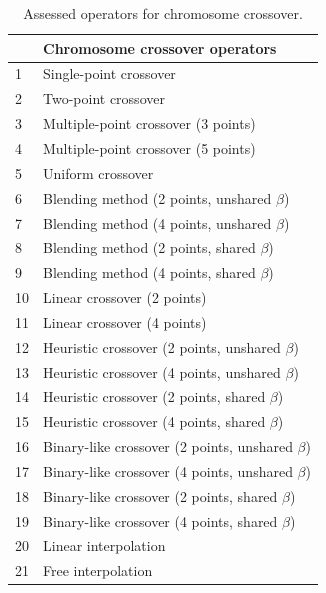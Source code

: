 \documentclass[twocol]{ametsoc}
\begin{document}
\begin{table}[htbp]
	\caption{Assessed operators for chromosome crossover.}
	\begin{center}
		\begin{tabular}{ll}
			\hline\hline  & \textbf{Chromosome crossover operators} \\ 
			\hline 
			1 & Single-point crossover \\
			2 & Two-point crossover \\
			3 & Multiple-point crossover (3 points) \\
			4 & Multiple-point crossover (5 points) \\
			5 & Uniform crossover \\
			6 & Blending method (2 points, unshared $\beta$) \\
			7 & Blending method (4 points, unshared $\beta$) \\
			8 & Blending method (2 points, shared $\beta$) \\
			9 & Blending method (4 points, shared $\beta$) \\
			10 & Linear crossover (2 points) \\
			11 & Linear crossover (4 points) \\
			12 & Heuristic crossover (2 points, unshared $\beta$) \\
			13 & Heuristic crossover (4 points, unshared $\beta$) \\
			14 & Heuristic crossover (2 points, shared $\beta$) \\
			15 & Heuristic crossover (4 points, shared $\beta$) \\
			16 & Binary-like crossover (2 points, unshared $\beta$) \\
			17 & Binary-like crossover (4 points, unshared $\beta$) \\
			18 & Binary-like crossover (2 points, shared $\beta$) \\
			19 & Binary-like crossover (4 points, shared $\beta$) \\
			20 & Linear interpolation \\
			21 & Free interpolation \\
			\hline
		\end{tabular}
	\end{center}
	\label{tab:assessed_crossover_operators}
\end{table}
\end{document}
